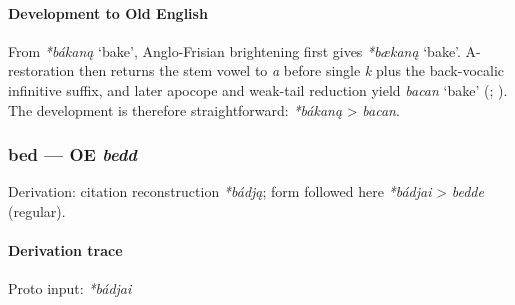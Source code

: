 \documentclass[
  british,
  a4paper,
]{article}
\providecommand{\Recon}[1]{\emph{*#1}}
\begin{document}
\paragraph{Development to Old
English}\label{development-to-old-english-1}

From \Recon{bákaną} `bake', Anglo-Frisian brightening first gives
\Recon{bækaną} `bake'. A-restoration then returns the stem vowel to
\emph{a} before single \emph{k} plus the back-vocalic infinitive suffix,
and later apocope and weak-tail reduction yield {\emph{bacan}} `bake'
(;
). The development
is therefore straightforward: \Recon{bákaną} \textgreater{}
{\emph{bacan}}.

\subsubsection{\texorpdfstring{bed --- OE
\emph{bedd}}{bed --- OE bedd}}\label{bed-oe-bedd}

Derivation: citation reconstruction \emph{*bádją}; form followed here
\emph{*bádjai} \textgreater{} \emph{bedde} (regular).

\paragraph{Derivation trace}\label{derivation-trace-2}

Proto input: \emph{*bádjai}

\begingroup
\setlength{\fboxsep}{6pt}
\end{document}
